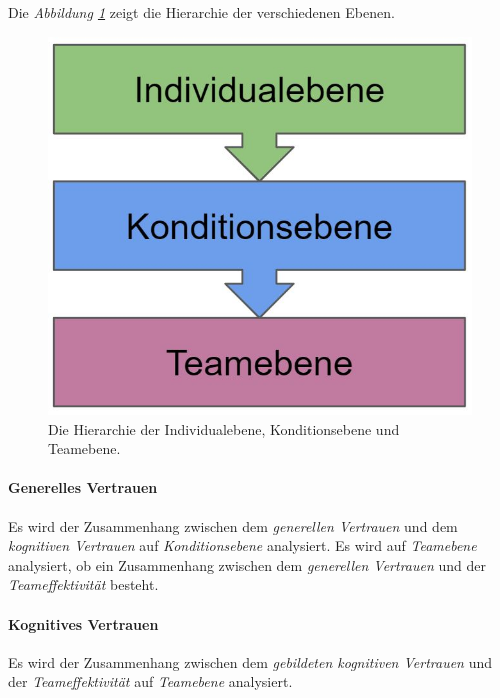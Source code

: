 \documentclass[a4paper,11pt]{article}%
\renewcommand{\\}{\vspace*{0.5\baselineskip} \newline}
\begin{document}
{Die \textit{Abbildung \ref{DifferentLevels}} zeigt die Hierarchie der verschiedenen Ebenen.

\begin{figure}[H]
		\begin{footnotesize}
		\centering
			\includegraphics[scale=0.4]{Abbildungen/DifferentLevels.JPG}	
			\caption[Die Hierarchieebenen]{Die Hierarchie der Individualebene, Konditionsebene und Teamebene.}
			\label{DifferentLevels}
		\end{footnotesize}
	\end{figure}

\paragraph{Generelles Vertrauen}
Es wird der Zusammenhang zwischen dem \textit{generellen Vertrauen} und dem \textit{kognitiven Vertrauen} auf \textit{Konditionsebene} analysiert.
Es wird auf \textit{Teamebene} analysiert, ob ein Zusammenhang zwischen dem \textit{generellen Vertrauen} und der \textit{Teameffektivität} besteht.

\paragraph{Kognitives Vertrauen}
Es wird der Zusammenhang zwischen dem \textit{gebildeten kognitiven Vertrauen} und der \textit{Teameffektivität} auf \textit{Teamebene} analysiert.

}
\end{document}

